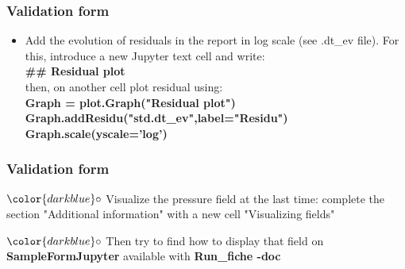 \documentclass[10pt, hyperref={unicode=true,pdfusetitle, bookmarks=true,bookmarksnumbered=false,bookmarksopen=false, breaklinks=false,pdfborder={0 0l 1},backref=true,colorlinks=true,linkcolor=darkblue,pageanchor}]{beamer}
\begin{document}
\begin{frame}
\frametitle{Validation form}
\begin{block}{}

\begin{itemize}
\item Add the evolution of residuals in the report in log scale (see .dt\_ev file). For this, introduce a new Jupyter text cell and write:\\
\textbf{\#\# Residual plot}\\
then, on another cell plot residual using:\\
\textbf{Graph = plot.Graph("Residual plot")} \\
\textbf{Graph.addResidu("std.dt\_ev",label="Residu")} \\
\textbf{Graph.scale(yscale='log')}
\end{itemize}

\end{block}
\end{frame}
\begin{frame}
\frametitle{Validation form}
\begin{block}{}

\hspace{1cm} $\color{darkblue}\circ$ {Visualize the pressure field at the last time: complete the section "Additional information" with a new cell "Visualizing fields" }

\hspace{1cm} $\color{darkblue}\circ$ Then try to find how to display that field on \textbf{SampleFormJupyter} available with \textbf{Run\_fiche -doc}

\end{block}
\end{frame}
\end{document}

